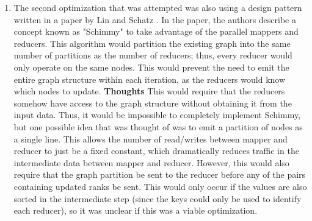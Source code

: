 \begin{enumerate}
\item The second optimization that was attempted was also using a design pattern
written in a paper by Lin and Schatz \cite{lin2010design}. In the paper, the authors
describe a concept known as "Schimmy" to take advantage of the parallel mappers and reducers. 
This algorithm would partition the existing graph into the same number of partitions 
as the number of reducers; thus, every reducer would only operate on the same nodes. 
This would prevent the need to emit the entire graph structure within each iteration,
as the reducers would know which nodes to update.
    \subitem \textbf{Thoughts} This would require that the reducers somehow have
    access to the graph structure without obtaining it from the input data. Thus, 
    it would be impossible to completely implement Schimmy, but one possible idea 
    that was thought of was to emit a partition of nodes as a single line. This 
    allows the number of read/writes between mapper and reducer to just be a fixed
    constant, which dramatically reduces traffic in the intermediate data between
    mapper and reducer. However, this would also require that the graph
    partition be sent to the reducer before any of the pairs containing updated ranks
    be sent. This would only occur if the values are also sorted in the intermediate step
    (since the keys could only be used to identify each reducer), so it
    was unclear if this was a viable optimization.
\end{enumerate}







